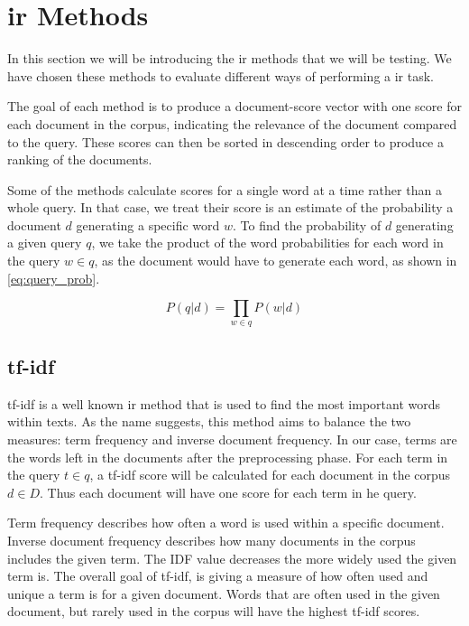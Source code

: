 \section{\gls{ir} Methods}\label{sec:ir_methods}

In this section we will be introducing the \gls{ir} methods that we will be testing.
We have chosen these methods to evaluate different ways of performing a \acrfull{ir} task.

The goal of each method is to produce a document-score vector with one score for each document in the corpus, indicating the relevance of the document compared to the query.
These scores can then be sorted in descending order to produce a ranking of the documents.

Some of the methods calculate scores for a single word at a time rather than a whole query.
In that case, we treat their score is an estimate of the probability a document $d$ generating a specific word $w$.
To find the probability of $d$ generating a given query $q$, we take the product of the word probabilities for each word in the query $w \in q$, as the document would have to generate each word, as shown in \autoref{eq:query_prob}.

\begin{equation}\label{eq:query_prob}
	P(q|d) = \prod_{w \in q} P(w|d)
\end{equation}





\subsection{\acrlong{tf-idf}}
\Gls{tf-idf} is a well known \gls{ir} method that is used to find the most important words within texts.
As the name suggests, this method aims to balance the two measures: term frequency and inverse document frequency.
In our case, terms are the words left in the documents after the preprocessing phase.
For each term in the query $t \in q$, a \gls{tf-idf} score will be calculated for each document in the corpus $d \in D$.
Thus each document will have one score for each term in he query.


Term frequency describes how often a word is used within a specific document.
Inverse document frequency describes how many documents in the corpus includes the given term.
The IDF value decreases the more widely used the given term is.
The overall goal of \gls{tf-idf}, is giving a measure of how often used and unique a term is for a given document. Words that are often used in the given document, but rarely used in the corpus will have the highest \gls{tf-idf} scores.


